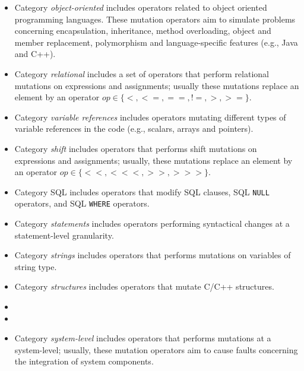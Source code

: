 \begin{itemize}
\item Category \emph{object-oriented} includes operators related to object oriented programming languages. These mutation operators aim to simulate problems concerning encapsulation, inheritance, method overloading, object and member replacement, polymorphism and language-specific features (e.g., Java and C++).
\item Category \emph{relational} includes a set of operators that perform relational mutations on expressions and assignments; usually these mutations replace an element by an operator $op \in \{<, <=, ==, !=, >, >=\}$.
\item Category \emph{variable references} includes operators mutating different types of variable references in the code (e.g., scalars, arrays and pointers).
\item Category \emph{shift} includes operators that performs shift mutations on expressions and assignments; usually, these mutations replace an element by an operator $op \in \{<<, <<<, >>, >>>\}$.
\item Category SQL includes operators that modify SQL clauses, SQL \texttt{NULL} operators, and SQL \texttt{WHERE} operators.
\item Category \emph{statements} includes operators performing syntactical changes at a statement-level granularity.
\item Category \emph{strings} includes operators that performs mutations on variables of string type.
\item Category \emph{structures} includes operators that mutate C/C++ structures.
\item {}  
\item {}
\item Category \emph{system-level} includes operators that performs mutations at a system-level; usually, these mutation operators aim to cause faults concerning the integration of system components. 

\end{itemize}
